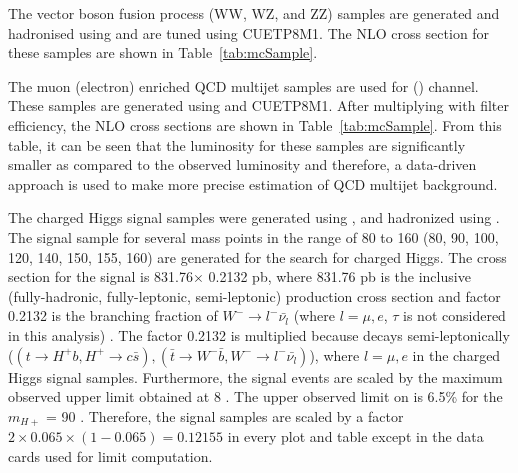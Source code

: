 The vector boson fusion process (WW, WZ, and ZZ) samples are generated and hadronised 
using \PYTHIA and are tuned using CUETP8M1. The NLO cross section for these samples are shown 
in Table~\ref{tab:mcSample}.

The muon (electron) enriched QCD multijet samples are used for \mujets (\ejets) channel. These 
samples are generated using \PYTHIA and CUETP8M1. After multiplying with filter efficiency, the 
NLO cross sections are shown in Table~\ref{tab:mcSample}. From this table, it can be seen that the 
luminosity for these samples are significantly 
smaller as compared to the observed luminosity and therefore, a data-driven approach is used to 
make more precise estimation of QCD multijet background.

The charged Higgs signal samples were generated using \MGvATNLO, and hadronized using \PYTHIA. The 
signal sample for several mass points in the range of 80 to 160 \GeV (80, 90, 100, 120, 140, 150, 
155, 160) are generated for the search for charged Higgs. The cross section 
for the signal is 831.76$\times$ 0.2132 pb, where 831.76 \unit{pb} is the inclusive 
(fully-hadronic, fully-leptonic, semi-leptonic) \ttjets production cross section and factor 
0.2132 is the branching fraction of $W^-\to l^- \bar{\nu_l}$ (where $l = \mu, e$, $\tau$ is not 
considered in this analysis) \cite{Beringer:1900zz}. The factor 0.2132 is multiplied because \ttbar decays 
semi-leptonically ($(t\to H^+ b, H^+\to c\bar{s}), (\bar{t}\to W^-\bar{b}, W^- \to l^-\bar{\nu_l})$), 
where $l = \mu, e$ in the charged Higgs signal samples. Furthermore, the signal events are scaled by 
the maximum observed upper limit obtained at 8 \TeV. The upper observed limit on \brThb is 6.5\% for
the $m_{H+}$ = 90 \GeV\cite{Khachatryan:2015uua}. Therefore, the signal samples are scaled by a factor 
$2\times 0.065\times (1-0.065) = 0.12155$ in every plot and table except in the data cards used for 
limit computation. 

